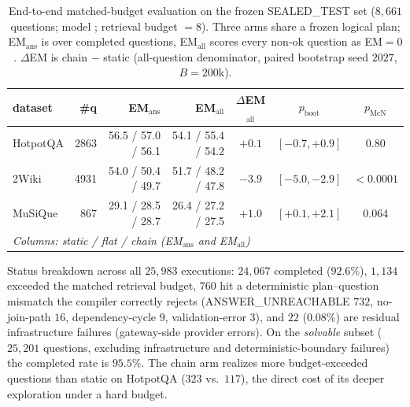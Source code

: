 \begin{table}[t]
\centering
\caption{End-to-end matched-budget evaluation on the frozen SEALED\_TEST set
($8{,}661$ questions; model ; retrieval budget $=8$). Three
arms share a frozen logical plan; EM$_{\text{ans}}$ is over completed
questions, EM$_{\text{all}}$ scores every non-ok question as EM$=0$.
$\Delta$EM is chain $-$ static (all-question denominator, paired bootstrap
seed $2027$, $B{=}200$k).}
\label{tab:overall}
\small
\begin{tabular}{lrrrccc}
\toprule
dataset & \#q & EM$_{\text{ans}}$ & EM$_{\text{all}}$ & $\Delta$EM$_{\text{all}}$ & $p_{\text{boot}}$ & $p_{\text{McN}}$ \\
\midrule
HotpotQA  & 2863 & 56.5 / 57.0 / 56.1 & 54.1 / 55.4 / 54.2 & $+0.1$ & $[-0.7,+0.9]$ & 0.80 \\
2Wiki     & 4931 & 54.0 / 50.4 / 49.7 & 51.7 / 48.2 / 47.8 & $-3.9$ & $[-5.0,-2.9]$ & $<0.0001$ \\
MuSiQue   & 867  & 29.1 / 28.5 / 28.7 & 26.4 / 27.2 / 27.5 & $+1.0$ & $[+0.1,+2.1]$ & 0.064 \\
\midrule
\multicolumn{7}{l}{\textit{Columns: static / flat / chain (EM$_{\text{ans}}$ and EM$_{\text{all}}$)}} \\
\bottomrule
\end{tabular}

{\footnotesize
Status breakdown across all $25{,}983$ executions: $24{,}067$ completed ($92.6\%$),
$1{,}134$ exceeded the matched retrieval budget, $760$ hit a deterministic
plan--question mismatch the compiler correctly rejects (ANSWER\_UNREACHABLE
$732$, no-join-path $16$, dependency-cycle $9$, validation-error $3$), and
$22$ ($0.08\%$) are residual infrastructure failures (gateway-side
provider errors). On the \emph{solvable} subset ($25{,}201$ questions, excluding
infrastructure and deterministic-boundary failures) the completed rate is
$95.5\%$. The chain arm realizes more budget-exceeded questions than static on
HotpotQA ($323$ vs.\ $117$), the direct cost of its deeper exploration under a
hard budget.}
\end{table}

